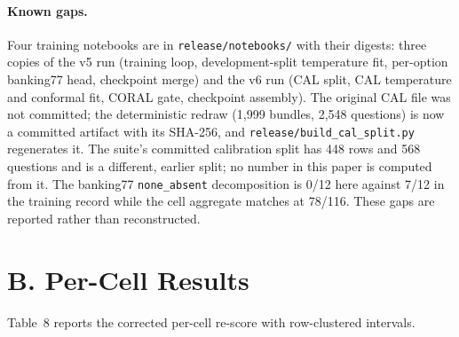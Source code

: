 \documentclass[11pt]{article}
\begin{document}
\paragraph{Known gaps.}
Four training notebooks are in \texttt{release/notebooks/} with their digests: three copies of the
v5 run (training loop, development-split temperature fit, per-option banking77 head, checkpoint
merge) and the v6 run (CAL split, CAL temperature and conformal fit, CORAL gate, checkpoint
assembly). The original CAL file was not committed; the deterministic redraw (1{,}999 bundles,
2{,}548 questions) is now a committed artifact with its SHA-256, and
\texttt{release/build\_cal\_split.py} regenerates it. The suite's committed calibration
split has 448 rows and 568 questions and is a different, earlier split; no number in this paper is
computed from it. The banking77 \texttt{none\_absent}
decomposition is 0/12 here against 7/12 in the training record while the cell aggregate matches at
78/116. These gaps are reported rather than reconstructed.

\section*{B. Per-Cell Results}
Table~8 reports the corrected per-cell re-score with row-clustered intervals.
\end{document}

